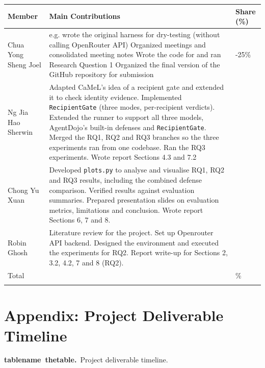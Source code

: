\documentclass[11pt]{article}
\newcommand{\code}[1]{\texttt{#1}}
\newcommand{\reportcaption}[3]{%
  \par\addvspace{0.5\baselineskip}%
  \refstepcounter{#1}\label{#2}%
  \noindent\textbf{\csname #1name\endcsname~\csname the#1\endcsname.}\ #3\par
}
\begin{document}
\begingroup
\setlength{\tabcolsep}{3pt}
\begin{longtable}{@{}>{\raggedright\arraybackslash}p{}>{\raggedright\arraybackslash}p{}>{\raggedright\arraybackslash}p{}@{}}
\toprule
\textbf{Member} & \textbf{Main Contributions} & \textbf{Share (\%)} \\
\midrule
\endhead
Chua Yong Sheng Joel & e.g. wrote the original harness for dry-testing (without calling OpenRouter API) Organized meetings and consolidated meeting notes Wrote the code for and ran Research Question 1 Organized the final version of the GitHub repository for submission & 20-25\% \\
\addlinespace[0.3em]
Ng Jia Hao Sherwin & Adapted CaMeL's idea of a recipient gate and extended it to check identity evidence. Implemented \code{RecipientGate} (three modes, per-recipient verdicts). Extended the runner to support all three models, AgentDojo's built-in defenses and \code{RecipientGate}. Merged the RQ1, RQ2 and RQ3 branches so the three experiments ran from one codebase. Ran the RQ3 experiments. Wrote report Sections 4.3 and 7.2 &  \\
\addlinespace[0.3em]
Chong Yu Xuan & Developed \code{plots.py} to analyse and visualise RQ1, RQ2 and RQ3 results, including the combined defense comparison. Verified results against evaluation summaries. Prepared presentation slides on evaluation metrics, limitations and conclusion. Wrote report Sections 6, 7 and 8. &  \\
\addlinespace[0.3em]
Robin Ghosh & Literature review for the project. Set up Openrouter API backend. Designed the environment and executed the experiments for RQ2. Report write-up for Sections 2, 3.2, 4.2, 7 and 8 (RQ2). &  \\
\addlinespace[0.3em]
Total &  & 100\% \\
\addlinespace[0.3em]
\bottomrule
\end{longtable}
\endgroup

\clearpage
\printbibliography[heading=bibintoc,title={References}]

\clearpage
\section*{Appendix: Project Deliverable Timeline}

\reportcaption{table}{tab:timeline}{Project deliverable timeline.}
\end{document}
